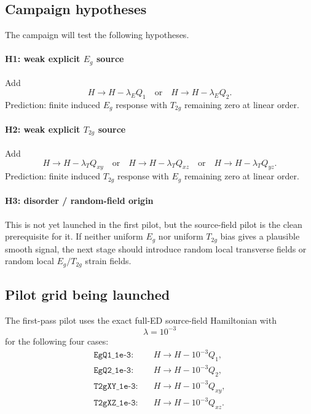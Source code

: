 \documentclass[11pt]{article}
\begin{document}
\subsection{Campaign hypotheses}

The campaign will test the following hypotheses.

\paragraph{H1: weak explicit $E_g$ source}
Add
\begin{equation}
H \rightarrow H - \lambda_E Q_1
\quad\text{or}\quad
H \rightarrow H - \lambda_E Q_2.
\end{equation}
Prediction: finite induced $E_g$ response with $T_{2g}$ remaining zero at
linear order.

\paragraph{H2: weak explicit $T_{2g}$ source}
Add
\begin{equation}
H \rightarrow H - \lambda_T Q_{xy}
\quad\text{or}\quad
H \rightarrow H - \lambda_T Q_{xz}
\quad\text{or}\quad
H \rightarrow H - \lambda_T Q_{yz}.
\end{equation}
Prediction: finite induced $T_{2g}$ response with $E_g$ remaining zero at
linear order.

\paragraph{H3: disorder / random-field origin}
This is not yet launched in the first pilot, but the source-field pilot is the
clean prerequisite for it. If neither uniform $E_g$ nor uniform $T_{2g}$ bias
gives a plausible smooth signal, the next stage should introduce random local
transverse fields or random local $E_g/T_{2g}$ strain fields.

\subsection{Pilot grid being launched}

The first-pass pilot uses the exact full-ED source-field Hamiltonian with
\begin{equation}
\lambda = 10^{-3}
\end{equation}
for the following four cases:
\begin{align}
\texttt{EgQ1\_1e-3}:& \quad H \rightarrow H - 10^{-3} Q_1, \\
\texttt{EgQ2\_1e-3}:& \quad H \rightarrow H - 10^{-3} Q_2, \\
\texttt{T2gXY\_1e-3}:& \quad H \rightarrow H - 10^{-3} Q_{xy}, \\
\texttt{T2gXZ\_1e-3}:& \quad H \rightarrow H - 10^{-3} Q_{xz}.
\end{align}
\end{document}
